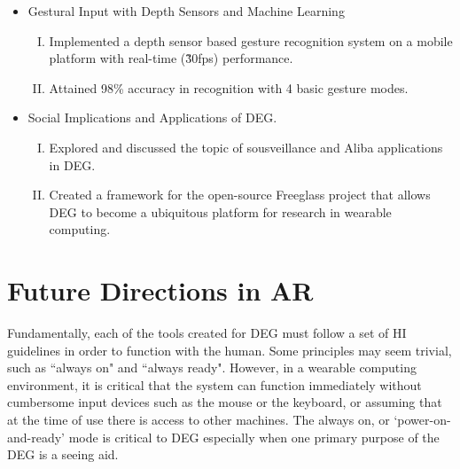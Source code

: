 \begin{itemize}
\item Gestural Input with Depth Sensors and Machine Learning
\begin{enumerate}[(I)]
\item Implemented a depth sensor based gesture recognition system on a mobile platform with real-time (\~30fps) performance.
\item Attained 98\% accuracy in recognition with 4 basic gesture modes.
\end{enumerate}

\item Social Implications and Applications of DEG. 
\begin{enumerate}[(I)]
\item Explored and discussed the topic of sousveillance and Aliba applications in DEG.
\item Created a framework for the open-source Freeglass project that allows DEG to become a ubiquitous platform for research in wearable computing.  
\end{enumerate}

\end{itemize}

\section{Future Directions in AR}



Fundamentally, each of the tools created for DEG must follow a set of HI guidelines in order to function with the human. Some principles may seem trivial, such as ``always on" and ``always ready". However, in a wearable computing environment, it is critical that the system can function immediately without cumbersome input devices such as the mouse or the keyboard, or assuming that at the time of use there is access to other machines. The always on, or `power-on-and-ready' mode is critical to DEG especially when one primary purpose of the DEG is a seeing aid. 

